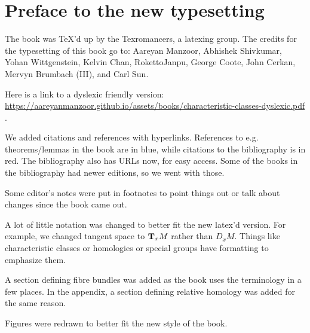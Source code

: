 \documentclass[../main]{subfiles}
\begin{document}
\chapter*{Preface to the new typesetting}

The book was TeX'd up by the Texromancers, a latexing group. The credits for the typesetting of this book go to: Aareyan Manzoor, Abhishek Shivkumar, Yohan Wittgenstein, Kelvin Chan, RokettoJanpu, George Coote, John Cerkan, Mervyn Brumbach (III), and Carl Sun.  %

Here is a link to a dyslexic friendly version: \url{https://aareyanmanzoor.github.io/assets/books/characteristic-classes-dyslexic.pdf} .

We added citations and references with hyperlinks. References to e.g. theorems/lemmas in the book are in blue, while citations to the bibliography is
in red. The bibliography also has URLs now, for easy access. Some of the books
in the bibliography had newer editions, so we went with those.

Some editor's notes were put in footnotes to point things out or talk about changes since the book came out.

A lot of little notation was changed to better fit the new latex'd version. For example, we changed tangent space to $\tangentspace{M}{x}$ rather than $D_x M$. Things like characteristic classes or homologies or special groups have formatting to emphasize them.

A section defining fibre bundles was added as the book uses the terminology in a few places. In the appendix, a section defining relative homology was added for the same reason.

Figures were redrawn to better fit the new style of the book.
\end{document}
